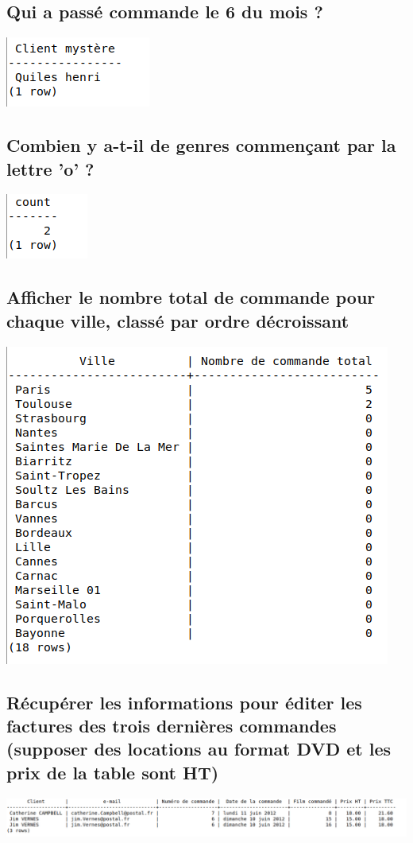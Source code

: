 \documentclass[]{scrartcl}
\begin{document}
\subsection{Qui a passé commande le 6 du mois ?}
	\includegraphics[scale=.5]{4}
	
\subsection{Combien y a-t-il de genres commençant par la lettre 'o' ?}
	\includegraphics[scale=.5]{5}

\subsection{Afficher le nombre total de commande pour chaque ville, classé par ordre décroissant}
	\includegraphics[scale=.5]{6}

\subsection{Récupérer les informations pour éditer les factures des trois dernières commandes (supposer des locations au format DVD et les prix de la table sont HT)}
	\includegraphics[scale=.4]{7}
\end{document}
